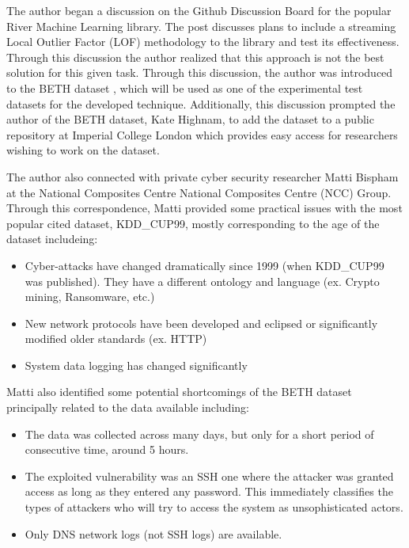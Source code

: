 The author began a discussion on the Github Discussion Board \cite{RiverGithub2022} for the popular River \cite{2020river} Machine Learning library. The post discusses plans to include a streaming Local Outlier Factor (LOF) methodology to the library and test its effectiveness. Through this discussion the author realized that this approach is not the best solution for this given task. Through this discussion, the author was introduced to the BETH dataset \cite{beth-dataset}, which will be used as one of the experimental test datasets for the developed technique. Additionally, this discussion prompted the author of the BETH dataset, Kate Highnam, to add the dataset to a public repository at Imperial College London which provides easy access for researchers wishing to work on the dataset.

The author also connected with private cyber security researcher Matti Bispham \cite{Bispham-email:private} at the National Composites Centre National Composites Centre (NCC) Group. Through this correspondence, Matti provided some practical issues with the most popular cited dataset, KDD\_CUP99, mostly corresponding to the age of the dataset includeing:

\begin{itemize}[leftmargin=2cm]
    \item Cyber-attacks have changed dramatically since 1999 (when KDD\_CUP99 was published). They have a different ontology and language (ex. Crypto mining, Ransomware, etc.)
    \item New network protocols have been developed and eclipsed or significantly modified older standards (ex. HTTP)
    \item System data logging has changed significantly
\end{itemize}

Matti also identified some potential shortcomings of the BETH dataset principally related to the data available including:

\begin{itemize}[leftmargin=2cm]
    \item The data was collected across many days, but only for a short period of consecutive time, around 5 hours.
    \item The exploited vulnerability was an SSH one where the attacker was granted access as long as they entered any password. This immediately classifies the types of attackers who will try to access the system as unsophisticated actors.
    \item Only DNS network logs (not SSH logs) are available.
\end{itemize}

